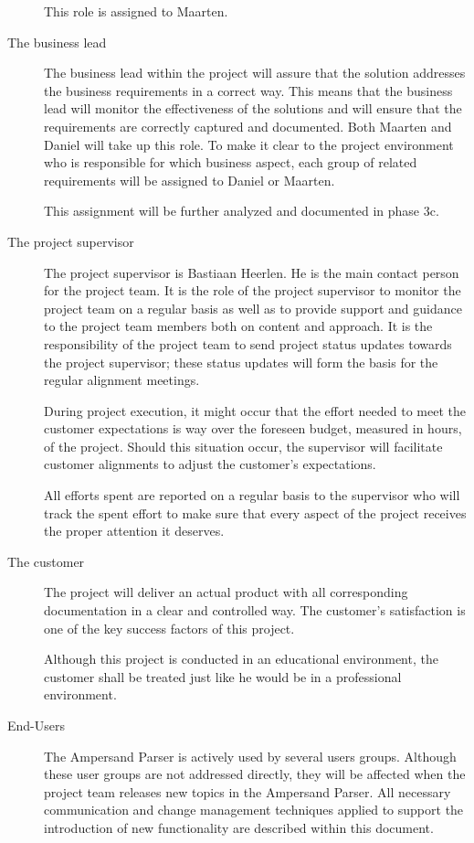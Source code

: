 \begin{description}
	This role is assigned to Maarten.

	\item[The business lead]

	The business lead within the project will assure that the solution addresses the business requirements in a correct way. 
	This means that the business lead will monitor the effectiveness of the solutions and will ensure that the requirements are correctly captured and documented.
	Both Maarten and Daniel will take up this role.
	To make it clear to the project environment who is responsible for which business aspect, each group of related requirements will be assigned to Daniel or Maarten.

	This assignment  will be further analyzed and documented in phase 3c.


	\item[The project supervisor]
	The project supervisor is Bastiaan Heerlen.
	He is the main contact person for the project team.
	It is the role of the project supervisor to monitor the project team on a regular basis as well as to provide support and guidance to the project team members both on content and approach.
	It is the responsibility of the project team to send project status updates towards the project supervisor; these status updates will form the basis for the regular alignment meetings.

	During project execution, it might occur that the effort needed to meet the customer expectations is way over the foreseen budget, measured in hours, of the project.
	Should this situation occur, the supervisor will facilitate customer alignments to adjust the customer's expectations.

	All efforts spent are reported on a regular basis to the supervisor who will track the spent effort to make sure that every aspect of the project receives the proper attention it deserves.

	\item[The customer]
	The project will deliver an actual product with all corresponding documentation in a clear and controlled way.
	The customer's satisfaction is one of the key success factors of this project.

	Although this project is conducted in an educational environment, the customer shall be treated just like he would be in a professional environment.

	\item[End-Users]
	The Ampersand Parser is actively used by several users groups.
	Although these user groups are not addressed directly, they will be affected when the project team releases new topics in the Ampersand Parser.
	All necessary communication and change management techniques applied to support the introduction of new functionality are described within this document.


\end{description}
